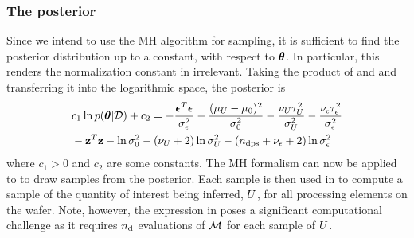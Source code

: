 \subsubsection{The posterior}
Since we intend to use the MH algorithm for sampling, it is sufficient to find the posterior distribution up to a constant, with respect to ${\boldsymbol\theta}$. In particular, this renders the normalization constant in  irrelevant. Taking the product of  and  and transferring it into the logarithmic space, the posterior is
\begin{align}
  & c_1 \ln \f{\vparam | \data} + c_2 = -\frac{\vnoise^T \vnoise}{\sigma^2_\noise} -\frac{(\mu_\U - \mu_0)^2}{\sigma^2_0} - \frac{\nu_\U \tau_\U^2}{\sigma^2_\U} - \frac{\nu_\noise \tau_\noise^2}{\sigma^2_\noise} \nonumber \\
  & {} - \vz^T\vz - \ln \sigma^2_0 - (\nu_\U + 2) \ln \sigma^2_\U - (\ndcs + \nu_\noise + 2) \ln \sigma^2_\noise \elabel{log-posterior}
\end{align}
where $c_1 > 0$ and $c_2$ are some constants. The MH formalism can now be applied to  to draw samples from the posterior. Each sample is then used in  to compute a sample of the quantity of interest being inferred, $U$, for all processing elements on the wafer. Note, however, the expression in  poses a significant computational challenge as it requires ${n_\text{d}}$ evaluations of $\model$ for each sample of $U$.
